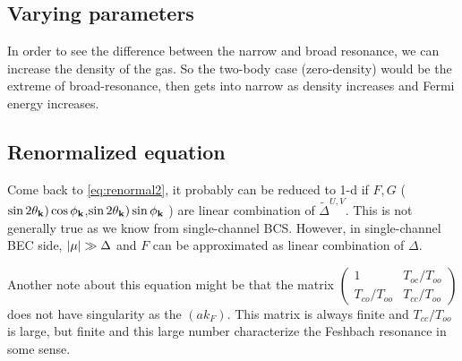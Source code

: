 \subsection{Varying parameters}
In order to see the difference between the narrow and broad resonance,  we can increase the density of the gas.  So the two-body case (zero-density) would be the extreme of broad-resonance, then gets into narrow as density increases and Fermi energy increases.  

\subsection{Renormalized equation}
Come back to \ref{eq:renormal2}, it probably can be reduced to 1-d if $F,G$ ($\sin2\theta_{\mathbf{k}})\cos\phi_{\mathbf{k}}$,$\sin2\theta_{\mathbf{k}})\sin\phi_{\mathbf{k}}$ ) are linear combination of $\widetilde\Delta^{U,V}$.  This is not generally true as we know from single-channel BCS.  However,   in single-channel BEC side,   $\lvert{\mu}\rvert\gg\Delta$ and $F$ can be approximated as linear combination of $\Delta$.  

Another note about this equation might be that the matrix $\begin{pmatrix}1&T_{oc}/T_{oo}\\T_{co}/T_{oo}&T_{cc}/T_{oo}\end{pmatrix}$ does not have singularity as the $(ak_{F})$.  This matrix is always finite and $T_{cc}/T_{oo}$ is large, but finite and this large number characterize the Feshbach resonance in some sense.  